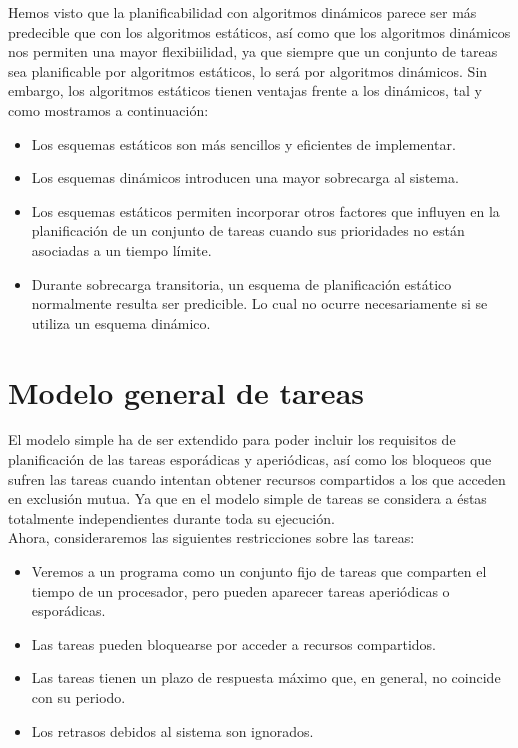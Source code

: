 Hemos visto que la planificabilidad con algoritmos dinámicos parece ser más predecible que con los algoritmos estáticos, así como que los algoritmos dinámicos nos permiten una mayor flexibiilidad, ya que siempre que un conjunto de tareas sea planificable por algoritmos estáticos, lo será por algoritmos dinámicos. Sin embargo, los algoritmos estáticos tienen ventajas frente a los dinámicos, tal y como mostramos a continuación:
\begin{itemize}
    \item Los esquemas estáticos son más sencillos y eficientes de implementar.
    \item Los esquemas dinámicos introducen una mayor sobrecarga al sistema.
    \item Los esquemas estáticos permiten incorporar otros factores que influyen en la planificación de un conjunto de tareas cuando sus prioridades no están asociadas a un tiempo límite.
    \item Durante sobrecarga transitoria, un esquema de planificación estático normalmente resulta ser predicible. Lo cual no ocurre necesariamente si se utiliza un esquema dinámico.
\end{itemize}

\section{Modelo general de tareas}
El modelo simple ha de ser extendido para poder incluir los requisitos de planificación de las tareas esporádicas y aperiódicas, así como los bloqueos que sufren las tareas cuando intentan obtener recursos compartidos a los que acceden en exclusión mutua. Ya que en el modelo simple de tareas se considera a éstas totalmente independientes durante toda su ejecución.\\

Ahora, consideraremos las siguientes restricciones sobre las tareas:
\begin{itemize}
    \item Veremos a un programa como un conjunto fijo de tareas que comparten el tiempo de un procesador, pero pueden aparecer tareas aperiódicas o esporádicas.
    \item Las tareas pueden bloquearse por acceder a recursos compartidos.
    \item Las tareas tienen un plazo de respuesta máximo que, en general, no coincide con su periodo.
    \item Los retrasos debidos al sistema son ignorados.
\end{itemize}

